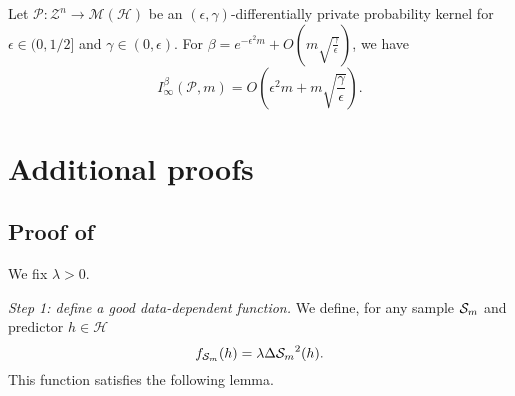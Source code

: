 \begin{noaddcontents}
\begin{proposition}
\label{prop: rogers}
Let $\mathcal{P}: \mathcal{Z}^n \rightarrow \mathcal{M}(\mathcal{H})$ be an $(\epsilon, \gamma)$-differentially private probability kernel for $\epsilon \in(0,1 / 2]$ and $\gamma \in(0, \epsilon)$.
For $\beta=e^{-\epsilon^2 m}+O\left(m \sqrt{\frac{\gamma}{\epsilon}}\right)$, we have
$$
I_{\infty}^\beta(\mathcal{P}, m)=O\left(\epsilon^2 m + m \sqrt{\frac{\gamma}{\epsilon}}\right) .
$$
\end{proposition}



 
\section{Additional proofs}
\label{sec: proofs_chap_5}
\subsection{Proof of }
\label{sec: proof_compact_mcall}
We fix $\lambda>0$.

\textit{Step 1: define a good data-dependent function.} We define, for any sample $\mathcal{S}_m$ and predictor $h\in \mathcal{H}$
\[ f_{\mathcal{S}_m}(h) = \lambda \Delta{\ensuremath{\mathcal{S}}_m}^2(h). \]
This function satisfies the following lemma.


\end{noaddcontents}
